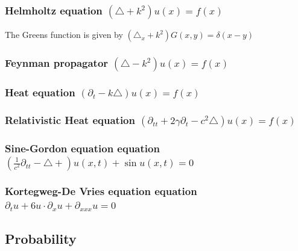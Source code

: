 \documentclass[10pt,a4paper]{book}
\theoremstyle{definition}
\begin{document}
\newpage
\subsubsection{Helmholtz equation \texorpdfstring{$(\triangle +k^2)u(x)= f(x)$}{TEXT}}
The Greens function is given by $(\triangle_x +k^2)G(x,y)=\delta(x-y)$

\subsubsection{Feynman propagator \texorpdfstring{$\left(\triangle-k^2\right) u(x)= f(x)$}{TEXT}}

\subsubsection{Heat equation \texorpdfstring{$\left(\partial_{t}-k\triangle\right) u(x)= f(x)$}{TEXT}}

\subsubsection{Relativistic Heat equation \texorpdfstring{$\left(\partial_{tt}+2\gamma\partial_t-c^2\triangle\right) u(x)= f(x)$}{TEXT}}

\subsubsection{Sine-Gordon equation equation \texorpdfstring{$\left(\frac{1}{c^2}\partial_{tt}-\triangle+\right) u(x,t)+\sin u(x,t)=0$}{TEXT}}

\subsubsection{Kortegweg-De Vries equation equation \texorpdfstring{$\partial_tu+6u\cdot\partial_x u+\partial_{xxx}u= 0$}{TEXT}}

\newpage
\subsection{Probability}
\end{document}
